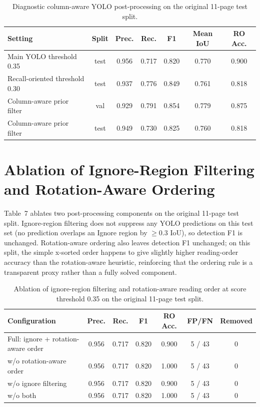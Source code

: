 \documentclass[pdflatex,sn-mathphys-num]{sn-jnl}
\begin{document}
\begin{table}[t]
\centering
\scriptsize\setlength{\tabcolsep}{3pt}
\caption{Diagnostic column-aware YOLO post-processing on the original 11-page test split.}
\begin{tabular}{lcccccc}
\toprule
Setting & Split & Prec. & Rec. & F1 & Mean IoU & RO Acc. \\
\midrule
Main YOLO threshold 0.35 & test & 0.956 & 0.717 & 0.820 & 0.770 & 0.900 \\
Recall-oriented threshold 0.30 & test & 0.937 & 0.776 & 0.849 & 0.761 & 0.818 \\
Column-aware prior filter & val & 0.929 & 0.791 & 0.854 & 0.779 & 0.875 \\
Column-aware prior filter & test & 0.949 & 0.730 & 0.825 & 0.760 & 0.818 \\
\bottomrule
\end{tabular}
\end{table}

\section{Ablation of Ignore-Region Filtering and Rotation-Aware Ordering}

Table~7 ablates two post-processing components on the original 11-page test split. Ignore-region filtering does not suppress any YOLO predictions on this test set (no prediction overlaps an Ignore region by $\geq$0.3 IoU), so detection F1 is unchanged. Rotation-aware ordering also leaves detection F1 unchanged; on this split, the simple x-sorted order happens to give slightly higher reading-order accuracy than the rotation-aware heuristic, reinforcing that the ordering rule is a transparent proxy rather than a fully solved component.

\begin{table}[t]
\centering
\scriptsize\setlength{\tabcolsep}{3pt}
\caption{Ablation of ignore-region filtering and rotation-aware reading order at score threshold 0.35 on the original 11-page test split.}
\begin{tabular}{lcccccc}
\toprule
Configuration & Prec. & Rec. & F1 & RO Acc. & FP/FN & Removed \\
\midrule
Full: ignore + rotation-aware order & 0.956 & 0.717 & 0.820 & 0.900 & 5 / 43 & 0 \\
w/o rotation-aware order & 0.956 & 0.717 & 0.820 & 1.000 & 5 / 43 & 0 \\
w/o ignore filtering & 0.956 & 0.717 & 0.820 & 0.900 & 5 / 43 & 0 \\
w/o both & 0.956 & 0.717 & 0.820 & 1.000 & 5 / 43 & 0 \\
\bottomrule
\end{tabular}
\end{table}
\end{document}

